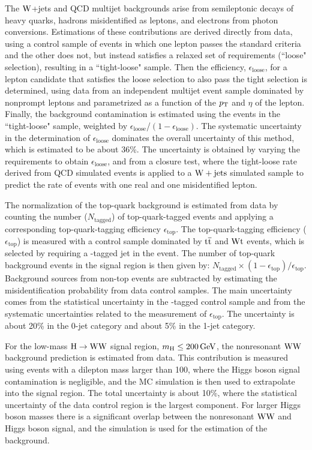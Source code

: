 \documentclass[12pt,twoside,a4paper,cmspaper,final,collab]{cms-tdr}
\begin{document}
The $\mathrm{W}$+jets and QCD multijet backgrounds arise from semileptonic
decays of heavy quarks, ha\-drons misidentified as leptons, and electrons
from photon conversions. Estimations of these contributions are derived
directly from data, using a control sample of events in which one lepton
passes the standard criteria and the other does not, but instead satisfies a
relaxed set of requirements (``loose" selection), resulting in a
``tight-loose" sample.
Then the efficiency, $\epsilon_\text{loose}$, for a lepton candidate that satisfies the loose
selection to also pass the tight selection is determined, using data from an
independent multijet event sample dominated by nonprompt leptons and
parametrized as a function of the $p_{\mathrm{T}}$ and $\eta$ of the lepton. Finally, the background
contamination is estimated using the events in the ``tight-loose"
sample, weighted by \mbox{$\epsilon_\text{loose}$/$(1-\epsilon_\text{loose})$}. The
systematic uncertainty in the  determination of $\epsilon_\text{loose}$
dominates the overall uncertainty of this method, which is estimated
to be about 36\%. The uncertainty is obtained by varying the requirements to
obtain $\epsilon_\text{loose}$, and from a closure test, where the tight-loose rate derived
from QCD simulated events is applied to a $\mathrm{W}+\text{jets}$ simulated sample to predict the rate of
events with one real and one misidentified lepton.

The normalization of the top-quark background is estimated from data
by counting the number ($N_\text{tagged}$) of top-quark-tagged events and applying a
corresponding top-quark-tagging efficiency $\epsilon_\text{top}$. The top-quark-tagging efficiency
($\epsilon_\text{top}$) is measured with a control sample dominated by
$\mathrm{t}\overline{\mathrm{t}}$ and $\mathrm{W}\mathrm{t}$ events, which is selected by requiring a \cPqb-tagged jet in the event.
The number of top-quark background events in the signal region is then given
by: $N_\text{tagged} \times (1-\epsilon_\text{top})/\epsilon_\text{top}$. Background
sources from non-top events are subtracted by estimating the misidentification
probability from data control samples. The main uncertainty comes from the statistical
uncertainty in the \cPqb-tagged control sample and from the systematic uncertainties related to
the measurement of $\epsilon_\text{top}$. The uncertainty is about
20\% in the 0-jet category and about 5\% in the 1-jet category.

For the low-mass $\mathrm{H} \to \mathrm{W}\mathrm{W}$ signal region, $m_{\mathrm{H}} \leq 200\,\text{Ge\hspace{-.08em}V}$,
the nonresonant $\mathrm{W}\mathrm{W}$ background prediction is estimated from data. This contribution
is measured using events with a dilepton mass larger than 100\GeV,
where the Higgs boson signal contamination is negligible, and the MC simulation
is then used to extrapolate into the signal region. The total uncertainty is
about 10\%, where the statistical uncertainty of the data control region is the
largest component.
For larger Higgs boson masses there is a significant overlap between the
nonresonant $\mathrm{W}\mathrm{W}$ and Higgs boson signal, and the simulation is
used for the estimation of the background.
\end{document}
